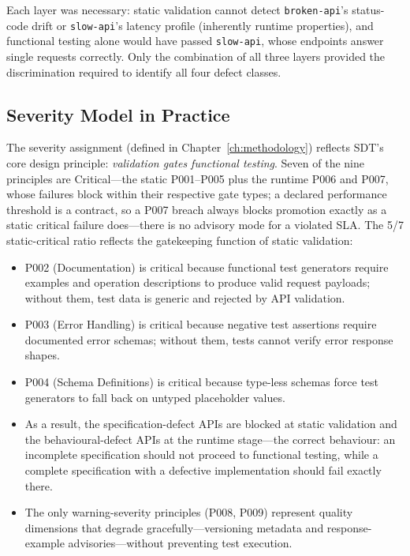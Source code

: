 Each layer was necessary: static validation cannot detect \texttt{broken-api}'s status-code drift or \texttt{slow-api}'s latency profile (inherently runtime properties), and functional testing alone would have passed \texttt{slow-api}, whose endpoints answer single requests correctly. Only the combination of all three layers provided the discrimination required to identify all four defect classes.

\subsection{Severity Model in Practice}
\label{subsec:severity-model}

The severity assignment (defined in Chapter~\ref{ch:methodology}) reflects SDT's core design principle: \textit{validation gates functional testing}. Seven of the nine principles are Critical---the static P001--P005 plus the runtime P006 and P007, whose failures block within their respective gate types; a declared performance threshold is a contract, so a P007 breach always blocks promotion exactly as a static critical failure does---there is no advisory mode for a violated SLA. The 5/7 static-critical ratio reflects the gatekeeping function of static validation:

\begin{itemize}
    \item P002 (Documentation) is critical because functional test generators require examples and operation descriptions to produce valid request payloads; without them, test data is generic and rejected by API validation.
    \item P003 (Error Handling) is critical because negative test assertions require documented error schemas; without them, tests cannot verify error response shapes.
    \item P004 (Schema Definitions) is critical because type-less schemas force test generators to fall back on untyped placeholder values.
    \item As a result, the specification-defect APIs are blocked at static validation and the behavioural-defect APIs at the runtime stage---the correct behaviour: an incomplete specification should not proceed to functional testing, while a complete specification with a defective implementation should fail exactly there.
    \item The only warning-severity principles (P008, P009) represent quality dimensions that degrade gracefully---versioning metadata and response-example advisories---without preventing test execution.
\end{itemize}

